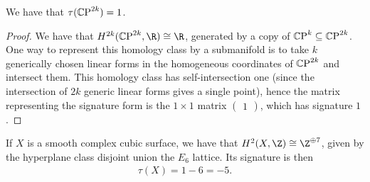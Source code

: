 \documentclass[11pt]{book}
\begin{document}
\begin{example}\label{exa:signature-CP2k} We have that $\tau({\mathbb{C}\text{P}}^{2k}) = 1$.
\end{example}
\begin{proof} We have that $H^{2k}(\CP^{2k},\R) \cong \R$, generated by a copy of ${\mathbb{C}\text{P}}^k \subseteq {\mathbb{C}\text{P}}^{2k}$. One way to represent this homology class by a submanifold is to take $k$ generically chosen linear forms in the homogeneous coordinates of ${\mathbb{C}\text{P}}^{2k}$ and intersect them. This homology class has self-intersection one (since the intersection of $2k$ generic linear forms gives a single point), hence the matrix representing the signature form is the $1\times1$ matrix $\begin{pmatrix} 1 \end{pmatrix}$, which has signature $1$.
\end{proof}


\begin{example}\label{exa:index-cubic-surface-by-cohomology} 
If $X$ is a smooth complex cubic surface, we have that $H^2(X,\Z) \cong \Z^{\oplus7}$, given by the hyperplane class disjoint union the $E_6$ lattice. Its signature is then 
\begin{align*}
    \tau(X) = 1-6 = -5.
\end{align*}
\end{example}
\end{document}
